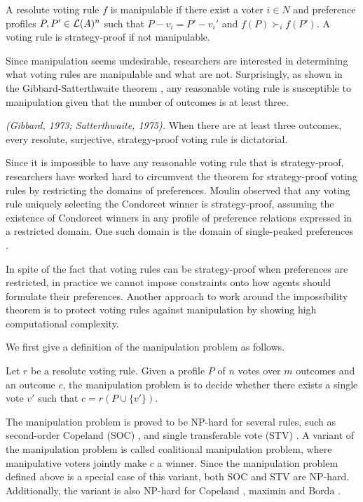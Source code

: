 \begin{definition}
	A resolute voting rule $f$ is manipulable if there exist
	a voter $i \in N$ and preference profiles $P,P' \in \mathcal{L}(A)^n$
	such that $P-v_i=P'-v_i'$ and $f(P) \succ_i f(P')$.
	A voting rule is strategy-proof if not manipulable.
\end{definition}

Since manipulation seems undesirable, researchers are
interested in determining what voting rules are
manipulable and what are not.
Surprisingly, as shown in the Gibbard-Satterthwaite
theorem \cite{gib:j:maip-scheme,satt:j:strat-proof},
any reasonable voting rule is susceptible to
manipulation given that the number of outcomes
is at least three.

\begin{thm}
\label{thm:Gib_Sat}
\emph{(Gibbard, 1973; Satterthwaite, 1975).}
	When there are at least three outcomes,
	every resolute, surjective, strategy-proof voting rule is
	dictatorial.
\end{thm}

Since it is impossible to have any reasonable voting rule that is strategy-proof,
researchers have worked hard to circumvent the theorem
for strategy-proof voting rules by restricting the domains
of preferences\cite{Brandt:COMSOC}.
Moulin \cite{Moul} observed that any voting rule uniquely selecting
the Condorcet winner is strategy-proof, assuming the existence
of Condorcet winners in any profile of preference relations
expressed in a restricted domain.
One such domain is the domain of single-peaked preferences
\cite{Sprumont}.

In spite of the fact that voting rules can be strategy-proof
when preferences are restricted, in practice we cannot impose
constraints onto how agents should formulate their preferences.
Another approach to work around the impossibility theorem is
to protect voting rules against manipulation by showing
high computational complexity.

We first give a definition of the manipulation problem as follows.
\begin{definition}
	Let $r$ be a resolute voting rule.  Given a profile $P$ of
	$n$ votes over $m$ outcomes and an outcome $c$, 
	the manipulation problem is to decide whether there exists
	a single vote $v'$ such that $c=r(P \cup \{v'\})$.
\end{definition}

The manipulation problem is proved to be NP-hard for several
rules, such as second-order Copeland (SOC) \cite{bartholdi:j:compdiff}, and
single transferable vote (STV) \cite{Bartholdi:STV}.
A variant of the manipulation problem is
called coalitional manipulation problem, where 
manipulative voters jointly make $c$ a winner.
Since the manipulation problem defined above is
a special case of this variant, both SOC and STV
are NP-hard.  Additionally, the variant is
also NP-hard for Copeland \cite{Faliszewski:Copeland},
maximin \cite{xia2009complexity} and Borda 
\cite{betzler2011unweighted,davies2011complexity}.

